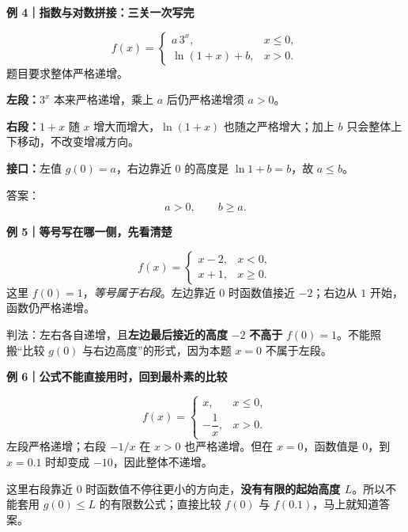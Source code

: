 \clearpage
\begin{examplebox}
\textbf{\textcolor{CExample}{例 4｜指数与对数拼接：三关一次写完}}


\[
 f(x)=\begin{cases}a\,3^x,&x\le0,\\\ln(1+x)+b,&x>0.\end{cases}
\]
题目要求整体严格递增。

\textbf{左段：}$3^x$ 本来严格递增，乘上 $a$ 后仍严格递增须 $a>0$。

\textbf{右段：}$1+x$ 随 $x$ 增大而增大，$\ln(1+x)$ 也随之严格增大；加上 $b$ 只会整体上下移动，不改变增减方向。

\textbf{接口：}左值 $g(0)=a$，右边靠近 $0$ 的高度是 $\ln 1+b=b$，故 $a\le b$。

答案：\[\boxed{a>0,\qquad b\ge a}.\]

\medskip
\end{examplebox}
\clearpage
\begin{examplebox}
\textbf{\textcolor{CExample}{例 5｜等号写在哪一侧，先看清楚}}


\[
 f(x)=\begin{cases}x-2,&x<0,\\x+1,&x\ge0.\end{cases}
\]
这里 $f(0)=1$，\emph{等号属于右段}。左边靠近 $0$ 时函数值接近 $-2$；右边从 $1$ 开始，函数仍严格递增。

判法：左右各自递增，且\textbf{左边最后接近的高度} $-2$ \textbf{不高于} $f(0)=1$。不能照搬“比较 $g(0)$ 与右边高度”的形式，因为本题 $x=0$ 不属于左段。

\medskip
\end{examplebox}
\clearpage
\begin{examplebox}
\textbf{\textcolor{CExample}{例 6｜公式不能直接用时，回到最朴素的比较}}


\[
 f(x)=\begin{cases}x,&x\le0,\\-\dfrac1x,&x>0.\end{cases}
\]
左段严格递增；右段 $-1/x$ 在 $x>0$ 也严格递增。但在 $x=0$，函数值是 $0$，到 $x=0.1$ 时却变成 $-10$，因此整体不递增。

这里右段靠近 $0$ 时函数值不停往更小的方向走，\textbf{没有有限的起始高度 $L$}。所以不能套用 $g(0)\le L$ 的有限数公式；直接比较 $f(0)$ 与 $f(0.1)$，马上就知道答案。
\end{examplebox}

